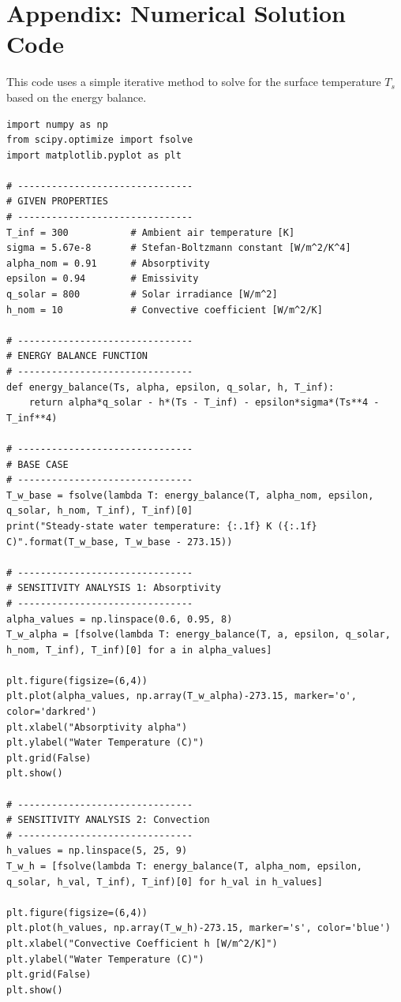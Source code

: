 \documentclass[12pt]{article}
\begin{document}
\section*{Appendix: Numerical Solution Code}
This code uses a simple iterative method to solve for the surface temperature $T_s$ based on the energy balance.

\begin{verbatim}
import numpy as np
from scipy.optimize import fsolve
import matplotlib.pyplot as plt

# -------------------------------
# GIVEN PROPERTIES
# -------------------------------
T_inf = 300           # Ambient air temperature [K]
sigma = 5.67e-8       # Stefan-Boltzmann constant [W/m^2/K^4]
alpha_nom = 0.91      # Absorptivity
epsilon = 0.94        # Emissivity
q_solar = 800         # Solar irradiance [W/m^2]
h_nom = 10            # Convective coefficient [W/m^2/K]

# -------------------------------
# ENERGY BALANCE FUNCTION
# -------------------------------
def energy_balance(Ts, alpha, epsilon, q_solar, h, T_inf):
    return alpha*q_solar - h*(Ts - T_inf) - epsilon*sigma*(Ts**4 - T_inf**4)

# -------------------------------
# BASE CASE
# -------------------------------
T_w_base = fsolve(lambda T: energy_balance(T, alpha_nom, epsilon, q_solar, h_nom, T_inf), T_inf)[0]
print("Steady-state water temperature: {:.1f} K ({:.1f} C)".format(T_w_base, T_w_base - 273.15))

# -------------------------------
# SENSITIVITY ANALYSIS 1: Absorptivity
# -------------------------------
alpha_values = np.linspace(0.6, 0.95, 8)
T_w_alpha = [fsolve(lambda T: energy_balance(T, a, epsilon, q_solar, h_nom, T_inf), T_inf)[0] for a in alpha_values]

plt.figure(figsize=(6,4))
plt.plot(alpha_values, np.array(T_w_alpha)-273.15, marker='o', color='darkred')
plt.xlabel("Absorptivity alpha")
plt.ylabel("Water Temperature (C)")
plt.grid(False)
plt.show()

# -------------------------------
# SENSITIVITY ANALYSIS 2: Convection
# -------------------------------
h_values = np.linspace(5, 25, 9)
T_w_h = [fsolve(lambda T: energy_balance(T, alpha_nom, epsilon, q_solar, h_val, T_inf), T_inf)[0] for h_val in h_values]

plt.figure(figsize=(6,4))
plt.plot(h_values, np.array(T_w_h)-273.15, marker='s', color='blue')
plt.xlabel("Convective Coefficient h [W/m^2/K]")
plt.ylabel("Water Temperature (C)")
plt.grid(False)
plt.show()
\end{verbatim}
\end{document}
